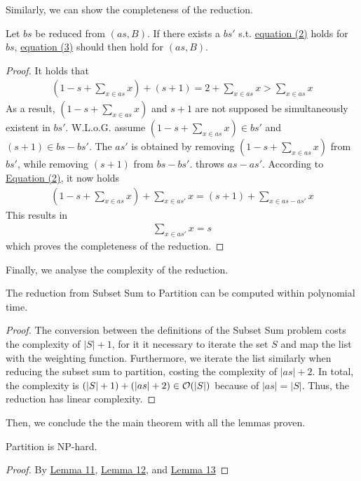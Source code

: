 Similarly, we can show the completeness of the reduction.
\begin{lemma}[Completeness]
    \label{lemma:12}
    Let $bs$ be reduced from $(as, B)$. If there exists a $bs'$ s.t. \hyperref[eq:2]{equation (2)} holds for $bs$, 
    \hyperref[eq:3]{equation (3)} should then hold for $(as, B)$.
\end{lemma}
\begin{proof}
    It holds that
\begin{align*}
    (1 - s + \sum_{x \in as} x) + (s + 1) = 2 + \sum_{x \in as} x > \sum_{x \in as} x
\end{align*}
As a result, $(1 - s + \sum_{x \in as} x)$ and $s + 1$ are not supposed be simultaneously existent in $bs'$. 
W.L.o.G. assume $(1 - s + \sum_{x \in as} x) \in bs'$ and $(s + 1) \in bs - bs'$. 
The $as'$ is obtained by removing $(1 - s + \sum_{x \in as} x)$ from $bs'$, while removing $(s + 1)$ from $bs - bs'$.
throws $as - as'$. According to \hyperref[eq:2]{Equation (2)}, it now holds 
\begin{align*}
    (1 - s + \sum_{x \in as} x) + \sum_{x \in as'} x = (s + 1) + \sum_{x \in as - as'} x
\end{align*}
This results in 
\begin{align*}
    \sum_{x \in as'} x = s
\end{align*}
which proves the completeness of the reduction.
\end{proof} 
Finally, we analyse the complexity of the reduction.
\begin{lemma}
    \label{lemma:13}
    The reduction from Subset Sum to Partition can be computed within polynomial time.
\end{lemma}
\begin{proof}
The conversion between the definitions of the Subset Sum problem costs the complexity of $|S| + 1$,
for it it necessary to iterate the set $S$ and map the list with the weighting function. Furthermore, we iterate the list similarly when reducing the subset sum to partition, costing
the complexity of $|as| + 2$. In total, the complexity is $(|S| + 1) + (|as| + 2) \in \mathcal{O}({|S|})$  because of $|as| = |S|$.
Thus, the reduction has linear complexity.
\end{proof}
Then, we conclude the the main theorem with all the lemmas proven.
\begin{theorem}
    Partition is NP-hard.
\end{theorem}
\begin{proof}
    By \hyperref[lemma:11]{Lemma 11}, \hyperref[lemma:12]{Lemma 12}, and \hyperref[lemma:13]{Lemma 13}
\end{proof}
